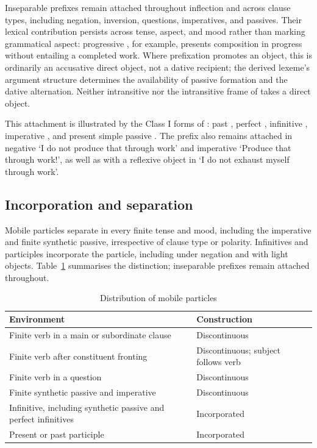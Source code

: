 Inseparable prefixes remain attached throughout inflection and across clause types, including negation, inversion, questions, imperatives, and passives. Their lexical contribution persists across tense, aspect, and mood rather than marking grammatical aspect: progressive , for example, presents composition in progress without entailing a completed work. Where prefixation promotes an object, this is ordinarily an accusative direct object, not a dative recipient; the derived lexeme's argument structure determines the availability of passive formation and the dative alternation. Neither intransitive  nor the intransitive frame of  takes a direct object.

This attachment is illustrated by the Class I forms of : past , perfect , infinitive , imperative , and present simple passive . The prefix also remains attached in negative  `I do not produce that through work' and imperative  `Produce that through work!', as well as with a reflexive object in  `I do not exhaust myself through work'.

\subsection{Incorporation and separation}
\label{sec:particle-placement}

Mobile particles separate in every finite tense and mood, including the imperative and finite synthetic passive, irrespective of clause type or polarity. Infinitives and participles incorporate the particle, including under negation and with light objects. Table~\ref{tab:particle-distribution} summarises the distinction; inseparable prefixes remain attached throughout.

\begin{table}[!ht]
    \caption{Distribution of mobile particles}
    \label{tab:particle-distribution}
    \small
    \begin{tabularx}{\textwidth}{X X}
        \toprule
        \rowcolor{grammarTableHead}
        \textbf{Environment} & \textbf{Construction} \\
        \midrule
        Finite verb in a main or subordinate clause & Discontinuous \\
        Finite verb after constituent fronting & Discontinuous; subject follows verb \\
        Finite verb in a question & Discontinuous \\
        Finite synthetic passive and imperative & Discontinuous \\
        Infinitive, including synthetic passive and perfect infinitives & Incorporated \\
        Present or past participle & Incorporated \\
        \bottomrule
    \end{tabularx}
\end{table}

